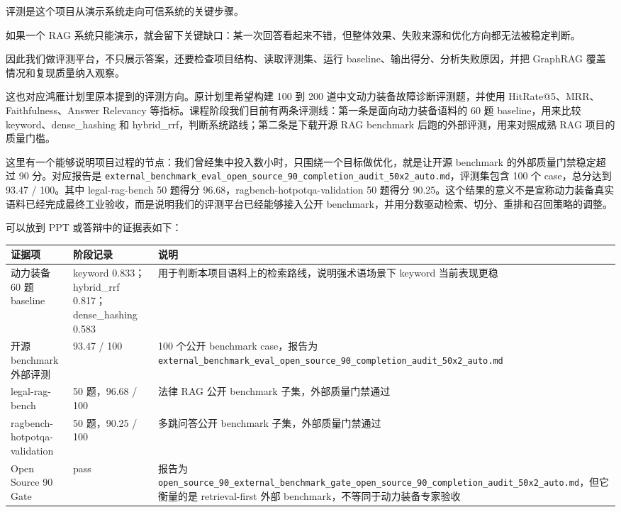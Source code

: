 \documentclass[10pt, a4paper]{ctexart}
\begin{document}
\begin{tcolorbox}[colback=white, colframe=primary!35, title={\textbf{第 16 页：评测平台让项目从能演示变成能评分}}, beforeafter skip=2.0pt]
\begin{minipage}[t]{0.72\textwidth}
  \linespread{1.0}\selectfont\footnotesize
  评测是这个项目从演示系统走向可信系统的关键步骤。

如果一个 RAG 系统只能演示，就会留下关键缺口：某一次回答看起来不错，但整体效果、失败来源和优化方向都无法被稳定判断。

因此我们做评测平台，不只展示答案，还要检查项目结构、读取评测集、运行 baseline、输出得分、分析失败原因，并把 GraphRAG 覆盖情况和复现质量纳入观察。

这也对应鸿雁计划里原本提到的评测方向。原计划里希望构建 100 到 200 道中文动力装备故障诊断评测题，并使用 HitRate@5、MRR、Faithfulness、Answer Relevancy 等指标。课程阶段我们目前有两条评测线：第一条是面向动力装备语料的 60 题 baseline，用来比较 keyword、dense\_hashing 和 hybrid\_rrf，判断系统路线；第二条是下载开源 RAG benchmark 后跑的外部评测，用来对照成熟 RAG 项目的质量门槛。

这里有一个能够说明项目过程的节点：我们曾经集中投入数小时，只围绕一个目标做优化，就是让开源 benchmark 的外部质量门禁稳定超过 90 分。对应报告是 \texttt{external\_benchmark\_eval\_open\_source\_90\_completion\_audit\_50x2\_auto.md}，评测集包含 100 个 case，总分达到 93.47 / 100。其中 legal-rag-bench 50 题得分 96.68，ragbench-hotpotqa-validation 50 题得分 90.25。这个结果的意义不是宣称动力装备真实语料已经完成最终工业验收，而是说明我们的评测平台已经能够接入公开 benchmark，并用分数驱动检索、切分、重排和召回策略的调整。

可以放到 PPT 或答辩中的证据表如下：

\begin{tabular}{p{3.5cm} p{3.0cm} p{6.5cm}}
\toprule
\textbf{证据项} & \textbf{阶段记录} & \textbf{说明} \\
\midrule
动力装备 60 题 baseline & keyword 0.833；hybrid\_rrf 0.817；dense\_hashing 0.583 & 用于判断本项目语料上的检索路线，说明强术语场景下 keyword 当前表现更稳 \\
\hline
开源 benchmark 外部评测 & 93.47 / 100 & 100 个公开 benchmark case，报告为 \texttt{external\_benchmark\_eval\_open\_source\_90\_completion\_audit\_50x2\_auto.md} \\
\hline
legal-rag-bench & 50 题，96.68 / 100 & 法律 RAG 公开 benchmark 子集，外部质量门禁通过 \\
\hline
ragbench-hotpotqa-validation & 50 题，90.25 / 100 & 多跳问答公开 benchmark 子集，外部质量门禁通过 \\
\hline
Open Source 90 Gate & pass & 报告为 \texttt{open\_source\_90\_external\_benchmark\_gate\_open\_source\_90\_completion\_audit\_50x2\_auto.md}，但它衡量的是 retrieval-first 外部 benchmark，不等同于动力装备专家验收 \\
\hline
\bottomrule
\end{tabular}


\end{minipage}
\end{tcolorbox}
\end{document}
